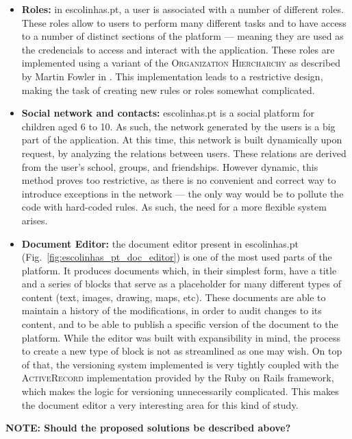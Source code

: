 \begin{itemize}
  \item \textbf{Roles:} in escolinhas.pt, a user is associated with a number of different roles. These roles allow to users to perform many different tasks and to have access to a number of distinct sections of the platform --- meaning they are used as the credencials to access and interact with the application. These roles are implemented using a variant of the \textsc{Organization Hiercharchy} as described by Martin Fowler in \cite{fowler_organization_hierarchy}. This implementation leads to a restrictive design, making the task of creating new rules or roles somewhat complicated. \\
  
  \item \textbf{Social network and contacts:} escolinhas.pt is a social platform for children aged 6 to 10. As such, the network generated by the users is a big part of the application. At this time, this network is built dynamically upon request, by analyzing the relations between users. These relations are derived from the user's school, groups, and friendships. However dynamic, this method proves too restrictive, as there is no convenient and correct way to introduce exceptions in the network --- the only way would be to pollute the code with hard-coded rules. As such, the need for a more flexible system arises. \\
  
  \item \textbf{Document Editor:} the document editor present in escolinhas.pt (Fig.~\ref{fig:escolinhas_pt_doc_editor}) is one of the most used parts of the platform. It produces documents which, in their simplest form, have a title and a series of blocks that serve as a placeholder for many different types of content (text, images, drawing, maps, etc). These documents are able to maintain a history of the modifications, in order to audit changes to its content, and to be able to publish a specific version of the document to the platform. While the editor was built with expansibility in mind, the process to create a new type of block is not as streamlined as one may wish. On top of that, the versioning system implemented is very tightly coupled with the \textsc{ActiveRecord} implementation provided by the Ruby on Rails framework, which makes the logic for versioning unnecessarily complicated. This makes the document editor a very interesting area for this kind of study. \\
\end{itemize}


\textbf{NOTE: Should the proposed solutions be described above?}

